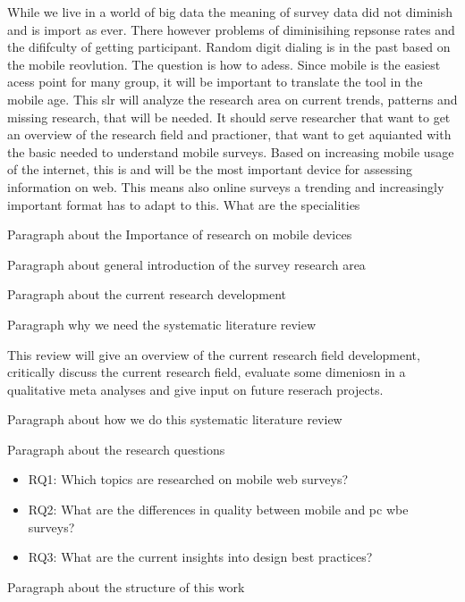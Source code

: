 While we live in a world of big data the meaning of survey data did not diminish and is import as ever. There however problems of diminisihing repsonse rates and the dififculty of getting participant. Random digit dialing is in the past based on the mobile reovlution. The question is how to adess. Since mobile is the easiest acess point for many group, it will be important to translate the tool in the mobile age. This slr will analyze the research area on current trends, patterns and missing research, that will be needed. It should serve researcher that want to get an overview of the research field and practioner, that want to get aquianted with the basic needed to understand mobile surveys. 
Based on increasing mobile usage of the internet, this is and will be the most important device for assessing information on web. This means also online surveys a trending and increasingly important format has to adapt to this. What are the specialities

Paragraph about the Importance of research on mobile devices

Paragraph about general introduction of the survey research area

Paragraph about the current research development

Paragraph why we need the systematic literature review

This review will give an overview of the current research field development, critically discuss the current research field, evaluate some dimeniosn in a qualitative meta analyses and give input on future reserach projects.

Paragraph about how we do this systematic literature review

Paragraph about the research questions
\begin{itemize}
    \item RQ1: Which topics are researched on mobile web surveys?
    \item RQ2: What are the differences in quality between mobile and pc wbe surveys?
    \item RQ3: What are the current insights into design best practices?
\end{itemize}

Paragraph about the structure of this work


